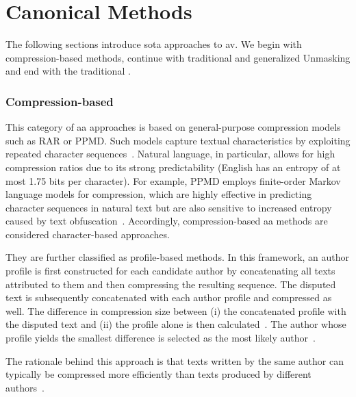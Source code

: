 \section{Canonical Methods}

The following sections introduce \ac{sota} approaches to \ac{av}.
We begin with compression-based methods, continue with traditional and generalized Unmasking and end with the traditional \impAppr{}.

\subsubsection{Compression-based}
This category of \ac{aa} approaches is based on general-purpose compression models such as RAR or PPMD. %
Such models capture textual characteristics by exploiting repeated character sequences~\citep{stamatatos_survey_2009,neal_surveying_2018}. 
Natural language, in particular, allows for high compression ratios due to its strong predictability (English has an entropy of at most 1.75 bits per character). 
For example, PPMD employs finite-order Markov language models for compression, which are highly effective in predicting character sequences in natural text but are also sensitive to increased entropy caused by text obfuscation~\citep{bevendorff_divergence_based_2020}.
Accordingly, compression-based \ac{aa} methods are considered character-based approaches.

They are further classified as profile-based methods. In this framework, an author profile is first constructed for each candidate author by concatenating all texts attributed to them and then compressing the resulting sequence. 
The disputed text is subsequently concatenated with each author profile and compressed as well. 
The difference in compression size between (i) the concatenated profile with the disputed text and (ii) the profile alone is then calculated~\citep{stamatatos_survey_2009,elmanarelbouanani_authorship_2014,neal_surveying_2018}. 
The author whose profile yields the smallest difference is selected as the most likely author~\citep{stamatatos_survey_2009,elmanarelbouanani_authorship_2014}.

The rationale behind this approach is that texts written by the same author can typically be compressed more efficiently than texts produced by different authors~\citep{stamatatos_survey_2009,elmanarelbouanani_authorship_2014}.

